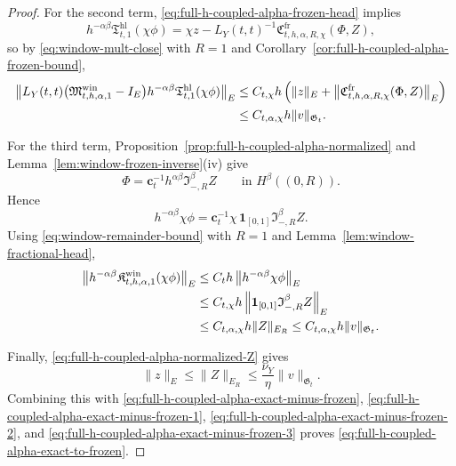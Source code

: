 \documentclass[11pt,a4paper]{amsart}
\theoremstyle{plain}
\theoremstyle{definition}
\theoremstyle{remark}
\newcommand{\one}{\mathbf 1}
\begin{document}
\begin{proof}
For the second term, \eqref{eq:full-h-coupled-alpha-frozen-head} implies
\[
h^{-\alpha\beta}\mathfrak T_{t,1}^{\mathrm{hl}}(\chi\phi)
=
\chi z
-
L_Y(t,t)^{-1}
\mathfrak C_{t,h,\alpha,R,\chi}^{\mathrm{fr}}(\Phi,Z),
\]
so by \eqref{eq:window-mult-close} with \(R=1\) and
Corollary~\ref{cor:full-h-coupled-alpha-frozen-bound},
\begin{align}
\left\|
L_Y(t,t)
\bigl(
\mathfrak M_{t,h,\alpha,1}^{\mathrm{win}}
-
I_E
\bigr)
h^{-\alpha\beta}\mathfrak T_{t,1}^{\mathrm{hl}}(\chi\phi)
\right\|_E
&\le
C_{t,\chi}h
\left(
\|z\|_E
+
\left\|
\mathfrak C_{t,h,\alpha,R,\chi}^{\mathrm{fr}}(\Phi,Z)
\right\|_E
\right)\notag\\
&\le
C_{t,\alpha,\chi}h\|v\|_{\mathfrak G_t}.
\label{eq:full-h-coupled-alpha-exact-minus-frozen-2}
\end{align}

For the third term, Proposition~\ref{prop:full-h-coupled-alpha-normalized} and
Lemma~\ref{lem:window-frozen-inverse}(iv) give
\[
\Phi
=
\mathbf c_t^{-1}h^{\alpha\beta}\mathfrak I_{-,R}^{\beta}Z
\qquad\text{in }H^\beta((0,R)).
\]
Hence
\[
h^{-\alpha\beta}\chi\phi
=
\mathbf c_t^{-1}\chi\,
\one_{[0,1]}
\mathfrak I_{-,R}^{\beta}Z.
\]
Using \eqref{eq:window-remainder-bound} with \(R=1\) and
Lemma~\ref{lem:window-fractional-head},
\begin{align}
\left\|
h^{-\alpha\beta}\mathfrak K_{t,h,\alpha,1}^{\mathrm{win}}(\chi\phi)
\right\|_E
&\le
C_t h
\left\|
h^{-\alpha\beta}\chi\phi
\right\|_E
\notag\\
&\le
C_{t,\chi}h
\left\|
\one_{[0,1]}\mathfrak I_{-,R}^{\beta}Z
\right\|_E
\notag\\
&\le
C_{t,\alpha,\chi}h\|Z\|_{E_R}
\le
C_{t,\alpha,\chi}h\|v\|_{\mathfrak G_t}.
\label{eq:full-h-coupled-alpha-exact-minus-frozen-3}
\end{align}

Finally, \eqref{eq:full-h-coupled-alpha-normalized-Z} gives
\[
\|z\|_E\le \|Z\|_{E_R}\le \frac{\nu_Y}{\eta}\|v\|_{\mathfrak G_t}.
\]
Combining this with
\eqref{eq:full-h-coupled-alpha-exact-minus-frozen},
\eqref{eq:full-h-coupled-alpha-exact-minus-frozen-1},
\eqref{eq:full-h-coupled-alpha-exact-minus-frozen-2}, and
\eqref{eq:full-h-coupled-alpha-exact-minus-frozen-3} proves
\eqref{eq:full-h-coupled-alpha-exact-to-frozen}.
\end{proof}
\end{document}
